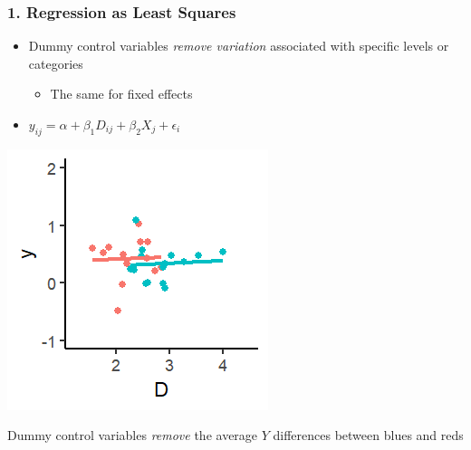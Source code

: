 \documentclass[xcolor=x11names,compress]{beamer}\usepackage[]{graphicx}\usepackage[]{color}
\makeatletter
\def\maxwidth{ %
  \ifdim\Gin@nat@width>\linewidth
    \linewidth
  \else
    \Gin@nat@width
  \fi
}
\newenvironment{knitrout}{}{} %
\renewcommand{\(}{\begin{columns}}
\renewcommand{\)}{\end{columns}}
\newcommand{\<}[1]{\begin{column}{#1}}
\renewcommand{\>}{\end{column}}
\makeatother
\begin{document}
\begin{frame}
\frametitle{1. Regression as Least Squares}
\begin{itemize}
\item Dummy control variables \textit{remove variation} associated with specific levels or categories
\begin{itemize}
\item The same for fixed effects
\end{itemize}
\item $y_{ij} = \alpha + \beta_1 D_{ij} + \beta_2 X_j + \epsilon_i$
\end{itemize}
\begin{multicols}{2}
\begin{knitrout}
\color{fgcolor}
\includegraphics[width=\maxwidth]{figure/graph_ols_FE4-1} 

\end{knitrout}
\columnbreak
Dummy control variables \textit{remove} the average $Y$ differences between blues and reds
\end{multicols}
\end{frame}
\end{document}
